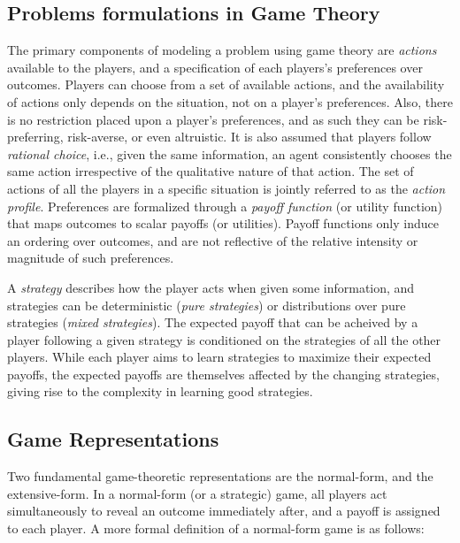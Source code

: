 \subsection{Problems formulations in Game Theory}
\label{subsec:reps}
The primary components of modeling a problem using game theory are \textit{actions} available to
the players, and a specification of each players's preferences over outcomes.
Players can choose from a set of available actions, and the availability of actions only depends on
the situation, not on a player's preferences.
Also, there is no restriction placed upon a player's preferences, and as such they can be
risk-preferring, risk-averse, or even altruistic.
It is also assumed that players follow \textit{rational choice}, i.e., given the same information,
an agent consistently chooses the same action irrespective of the qualitative nature of that
action.
The set of actions of all the players in a specific situation is jointly referred to as the
\textit{action profile}.
Preferences are formalized through a \textit{payoff function} (or utility function) that maps
outcomes to scalar payoffs (or utilities).
Payoff functions only induce an ordering over outcomes, and are not reflective of the relative
intensity or magnitude of such preferences.

A \textit{strategy} describes how the player acts when given some information, and strategies can
be deterministic (\textit{pure strategies}) or distributions over pure strategies (\textit{mixed
	strategies}).
The expected payoff that can be acheived by a player following a given strategy is conditioned on
the strategies of all the other players.
While each player aims to learn strategies to maximize their expected payoffs, the expected payoffs
are themselves affected by the changing strategies, giving rise to the complexity in learning good
strategies.

\subsection{Game Representations}

Two fundamental game-theoretic representations are the normal-form, and the extensive-form.
In a normal-form (or a strategic) game, all players act simultaneously to reveal an outcome
immediately after, and a payoff is assigned to each player.
A more formal definition of a normal-form game is as follows:

